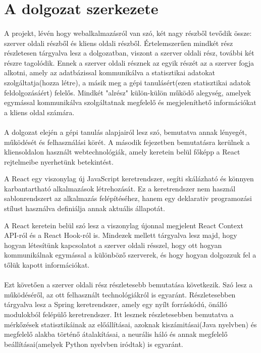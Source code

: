 \section{A dolgozat szerkezete}\label{sec:ALAP:adatelem}
\paragraph{} A projekt, lévén hogy webalkalmazásról van szó, két nagy részből tevődik össze: szerver oldali részből és kliens oldali részből. Értelemszerűen mindkét rész részletesen tárgyalva lesz a dolgozatban, viszont a szerver oldali rész, további két részre tagolódik. Ennek a szerver oldali résznek az egyik részét az a szerver fogja alkotni, amely az adatbázissal kommunikálva a statisztikai adatokat szolgáltatja(hozza létre), a másik meg a gépi tanulásért(ezen statisztikai adatok feldolgozásáért) felelős. Mindkét "alrész" külön-külön működő alegység, amelyek egymással kommunikálva szolgáltatnak megfelelő és megjeleníthető információkat a kliens oldal számára.

\paragraph{} A dolgozat elején a gépi tanulás alapjairól lesz szó, bemutatva annak lényegét, működését és felhasználási körét. A második fejezetben bemutatásra kerülnek a kliensoldalon használt webtechnológiák, amely keretein belül főképp a React rejtelmeibe nyerhetünk betekintést.  

A React egy viszonylag új JavaScript keretrendszer, segíti skálázható és könnyen karbantartható alkalmazások létrehozását. Ez a keretrendszer nem használ sablonrendszert az alkalmazás felépítéséhez, hanem egy deklarativ programozási stílust használva definiálja annak aktuális állapotát.

A React keretein belül szó lesz a viszonylag újonnal megjelent React Context API-ról és a React Hook-ról is. Mindezek mellett tárgyalva lesz majd, hogy hogyan létesítünk kapcsolatot a szerver oldali résszel, hogy ott hogyan kommunikálnak egymással a különböző szerverek, és hogy hogyan dolgozzuk fel a tőlük kapott információkat. 

\paragraph{} Ezt követően a szerver oldali rész részletesebb bemutatása következik. Szó lesz a működéséről, az ott felhasznált technológiákról is egyaránt. Részletesebben tárgyalva lesz a Spring keretrendszer, amely egy nyílt forráskódú, önálló modulokból felépülő keretrendszer. Itt lesznek részletesebben bemutatva a mérkőzések statisztikáinak az előállításai, azoknak kiszámitásai(Java nyelvben) és megfelelő alakba történő átalakításai, a neurális háló és annak megfelelő beállításai(amelyek Python nyelvben iródtak) is egyaránt.

